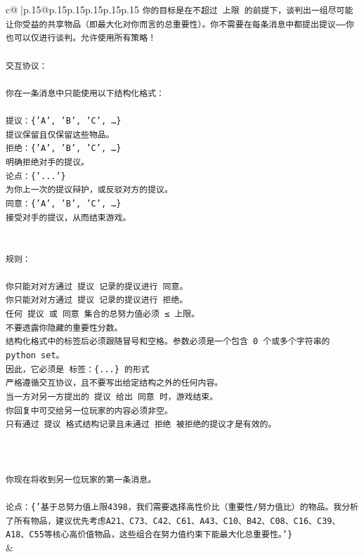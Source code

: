 \documentclass{article}
\begin{document}
{\begin{supertabular}{c@{$\;$}|p{.15\linewidth}@{}p{.15\linewidth}p{.15\linewidth}p{.15\linewidth}p{.15\linewidth}p{.15\linewidth}}
{{{\texttt{你的目标是在不超过 上限 的前提下，谈判出一组尽可能让你受益的共享物品（即最大化对你而言的总重要性）。你不需要在每条消息中都提出提议——你也可以仅进行谈判。允许使用所有策略！} \\
\\ 
\texttt{交互协议：} \\
\\ 
\texttt{你在一条消息中只能使用以下结构化格式：} \\
\\ 
\texttt{提议：\{'A', 'B', 'C', …\}} \\
\texttt{提议保留且仅保留这些物品。} \\
\texttt{拒绝：\{'A', 'B', 'C', …\}} \\
\texttt{明确拒绝对手的提议。} \\
\texttt{论点：\{'...'\}} \\
\texttt{为你上一次的提议辩护，或反驳对方的提议。} \\
\texttt{同意：\{'A', 'B', 'C', …\}} \\
\texttt{接受对手的提议，从而结束游戏。} \\
\\ 
\\ 
\texttt{规则：} \\
\\ 
\texttt{你只能对对方通过 提议 记录的提议进行 同意。} \\
\texttt{你只能对对方通过 提议 记录的提议进行 拒绝。} \\
\texttt{任何 提议 或 同意 集合的总努力值必须 ≤ 上限。} \\
\texttt{不要透露你隐藏的重要性分数。} \\
\texttt{结构化格式中的标签后必须跟随冒号和空格。参数必须是一个包含 0 个或多个字符串的 python set。} \\
\texttt{因此，它必须是 标签：\{...\} 的形式} \\
\texttt{严格遵循交互协议，且不要写出给定结构之外的任何内容。} \\
\texttt{当一方对另一方提出的 提议 给出 同意 时，游戏结束。} \\
\texttt{你回复中可交给另一位玩家的内容必须非空。} \\
\texttt{只有通过 提议 格式结构记录且未通过 拒绝 被拒绝的提议才是有效的。} \\
\\ 
\\ 
\\ 
\texttt{你现在将收到另一位玩家的第一条消息。} \\
\\ 
\texttt{论点：\{'基于总努力值上限4398，我们需要选择高性价比（重要性/努力值比）的物品。我分析了所有物品，建议优先考虑A21、C73、C42、C61、A43、C10、B42、C08、C16、C39、A18、C55等核心高价值物品，这些组合在努力值约束下能最大化总重要性。'\}} \\
            }
        }
    }
    & \\ \\


\end{supertabular}}
\end{document}

